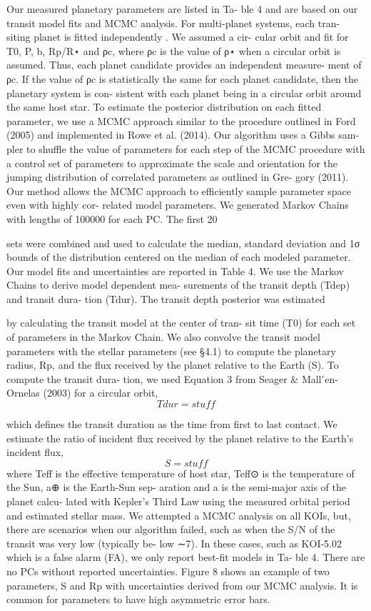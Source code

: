 Our measured planetary parameters are listed in Ta- ble 4 and are based on our transit model fits and MCMC analysis. For multi-planet systems, each tran- siting planet is fitted independently . We assumed a cir- cular orbit and fit for T0, P, b, Rp/R⋆ and ρc, where ρc is the value of ρ⋆ when a circular orbit is assumed. Thus, each planet candidate provides an independent measure- ment of ρc. If the value of ρc is statistically the same for each planet candidate, then the planetary system is con- sistent with each planet being in a circular orbit around the same host star.
To estimate the posterior distribution on each fitted parameter, we use a MCMC approach similar to the procedure outlined in Ford (2005) and implemented in Rowe et al. (2014). Our algorithm uses a Gibbs sam- pler to shuffle the value of parameters for each step of the MCMC procedure with a control set of parameters to approximate the scale and orientation for the jumping distribution of correlated parameters as outlined in Gre- gory (2011). Our method allows the MCMC approach to efficiently sample parameter space even with highly cor- related model parameters. We generated Markov Chains with lengths of 100000 for each PC. The first 20%

sets were combined and used to calculate the median, standard deviation and 1σ bounds of the distribution centered on the median of each modeled parameter. Our model fits and uncertainties are reported in Table 4. We use the Markov Chains to derive model dependent mea- surements of the transit depth (Tdep) and transit dura- tion (Tdur). The transit depth posterior was estimated

by calculating the transit model at the center of tran- sit time (T0) for each set of parameters in the Markov Chain. We also convolve the transit model parameters with the stellar parameters (see §4.1) to compute the planetary radius, Rp, and the flux received by the planet relative to the Earth (S). To compute the transit dura- tion, we used Equation 3 from Seager & Mall ́en-Ornelas (2003) for a circular orbit,
$$Tdur = stuff$$

which defines the transit duration as the time from first to last contact. We estimate the ratio of incident flux received by the planet relative to the Earth’s incident
flux,
$$S = stuff$$
where Teff is the effective temperature of host star, Teff⊙ is the temperature of the Sun, a⊕ is the Earth-Sun sep- aration and a is the semi-major axis of the planet calcu- lated with Kepler’s Third Law using the measured orbital period and estimated stellar mass.
We attempted a MCMC analysis on all KOIs, but, there are scenarios when our algorithm failed, such as when the S/N of the transit was very low (typically be- low ∼7). In these cases, such as KOI-5.02 which is a false alarm (FA), we only report best-fit models in Ta- ble 4. There are no PCs without reported uncertainties. Figure 8 shows an example of two parameters, S and Rp with uncertainties derived from our MCMC analysis. It is common for parameters to have high asymmetric error bars.
